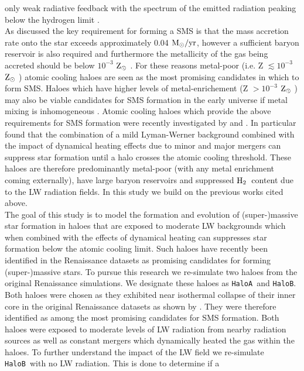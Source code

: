 \documentclass[graphics, twocolumn, usenatbib]{mn2e}
\newcommand{\msolaryrc} {$\rm{M_{\odot}/yr}$}
\newcommand{\zsolar} {$\rm{Z_{\odot}}~$}
\newcommand{\molH} {$\rm{H_2}$~}
\newcommand{\ha} {\texttt{HaloA~}}
\newcommand{\hb} {\texttt{HaloB~}}
\newcommand{\hbc} {\texttt{HaloB}}
\begin{document}
only weak radiative feedback with the spectrum of the emitted radiation peaking below the hydrogen limit \citep{Woods_2018}. \\
\indent As discussed the key requirement for
forming a SMS is that the mass accretion rate onto the star exceeds approximately 0.04 \msolaryrc, however a sufficient baryon reservoir is also required and furthermore the metallicity of the gas being accreted should be below 
$10^{-3}$ \zsolar \citep{Chon_2020}. For these reasons metal-poor (i.e. Z $\lesssim 10^{-3}$ \zsolar) atomic cooling haloes are seen as the most 
promising candidates in which to form SMS. Haloes which have higher levels of 
metal-enrichement (Z $> 10^{-3}$ \zsolar) may also be viable candidates for 
SMS formation in the early universe if metal mixing is inhomogeneous \citep{Regan_2020a}. Atomic cooling haloes which provide the above requirements for SMS formation were recently investigated by \cite{Wise_2019} and \cite{Regan_2020}. In particular \cite{Wise_2019} found that the combination 
of a mild Lyman-Werner background combined with the impact of dynamical heating effects due to minor and major mergers can suppress star formation until a halo crosses the atomic cooling threshold. These haloes are therefore predominantly metal-poor (with any metal enrichment coming externally), have large 
baryon reservoirs and suppressed \molH content due to the LW radiation fields. 
In this study we build on the previous works cited above. \\
\indent The goal of this study is to model the formation and evolution of (super-)massive star
  formation in haloes that are exposed to moderate LW backgrounds which when combined with the effects
  of dynamical heating can suppresses star formation below the atomic cooling limit.
  Such haloes have recently been identified in the Renaissance datasets \citep{Wise_2019, Regan_2019}
  as promising candidates for forming (super-)massive stars.  To pursue this research we re-simulate
  two haloes from the original Renaissance simulations. We designate
  these haloes as \ha and \hbc. Both haloes were chosen as they exhibited near isothermal
  collapse of their inner core in the original Renaissance datasets as shown by \cite{Regan_2019}.
  They were therefore identified as among the most promising candidates for SMS formation. Both
  haloes were exposed to moderate levels of LW radiation from nearby radiation sources as well as
  constant mergers which dynamically heated the gas within the haloes. To further understand the
  impact of the LW field we re-simulate \hb with no LW radiation. This is done to determine if a
\end{document}
